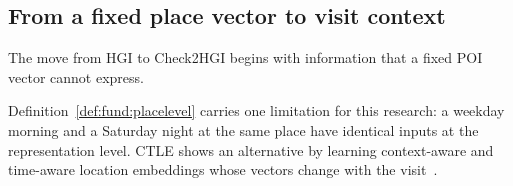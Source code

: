 
\subsection{From a fixed place vector to visit context}

The move from HGI to Check2HGI begins with information that a fixed POI vector cannot
express.

Definition~\ref{def:fund:placelevel} carries one limitation for this research: a
weekday morning and a Saturday night at the same place have identical inputs at the
representation level. CTLE shows an alternative by learning context-aware and
time-aware location embeddings whose vectors change with the
visit~\cite{lin2021ctle}.

